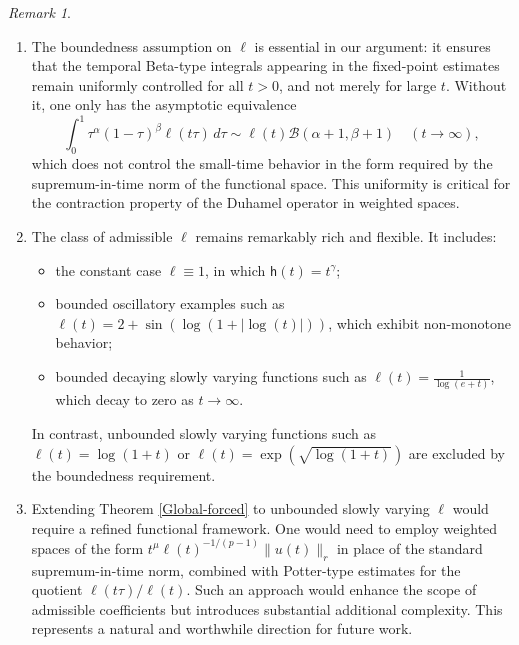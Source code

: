 \documentclass[12pt,reqno]{amsart}
\theoremstyle{plain}
\theoremstyle{definition}
\theoremstyle{remark}
\newtheorem{rem}[thm]{Remark}
\numberwithin{equation}{section}
\newcommand{\h}{\mathsf h}
\begin{document}
\begin{rem}
    ~\rm 
    \begin{enumerate}[label=(\roman*)]
    \item The boundedness assumption on $\ell$ is essential in our argument: it ensures 
    that the temporal Beta-type integrals appearing in the fixed-point estimates remain 
    uniformly controlled for all $t > 0$, and not merely for large $t$. Without it, one only 
    has the asymptotic equivalence
    $$\int_0^1 \tau^\alpha(1-\tau)^\beta \ell(t\tau) \, d\tau \sim \ell(t) \mathscr{B}(\alpha+1, \beta+1) 
    \quad (t \to \infty),$$
    which does not control the small-time behavior in the form required by the supremum-in-time 
    norm of the functional space. This uniformity is critical for the contraction property of 
    the Duhamel operator in weighted spaces.
 
\item The class of admissible $\ell$ remains remarkably rich and flexible. It includes:
    \begin{itemize}
        \item the constant case $\ell \equiv 1$, in which $\h(t) = t^\gamma$;
        \item bounded oscillatory examples such as $\ell(t) = 2 + \sin(\log(1 + |\log(t)|))$, 
        which exhibit non-monotone behavior;
        \item bounded decaying slowly varying functions such as $\ell(t) = \frac{1}{\log(e+t)}$, 
        which decay to zero as $t \to \infty$.
    \end{itemize}
    In contrast, unbounded slowly varying functions such as $\ell(t) = \log(1+t)$ or 
    $\ell(t) = \exp(\sqrt{\log(1+t)})$ are excluded by the boundedness requirement. 
\item Extending Theorem \ref{Global-forced} to unbounded slowly varying $\ell$ would 
    require a refined functional framework. One would need to employ weighted spaces of the form 
    $t^\mu \ell(t)^{-1/(p-1)} \|u(t)\|_r$ in place of the standard supremum-in-time norm, 
    combined with Potter-type estimates for the quotient $\ell(t\tau)/\ell(t)$. Such an approach 
    would enhance the scope of admissible coefficients but introduces substantial additional 
    complexity. This represents a natural and worthwhile direction for future work.
  

\end{enumerate}
\end{rem}
\end{document}
